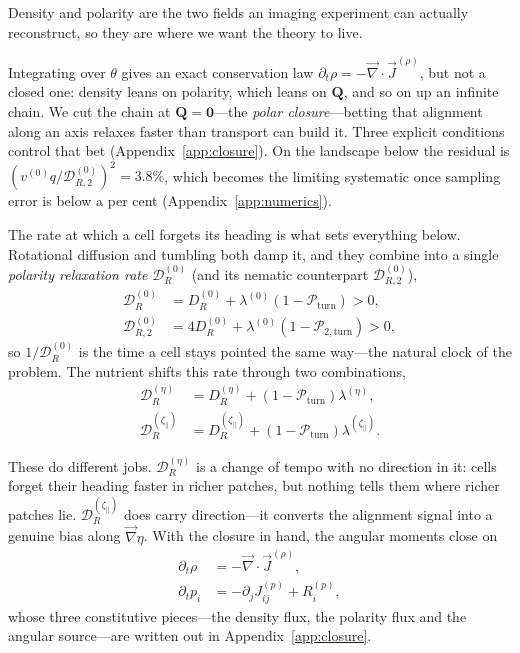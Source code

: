 \documentclass[
  reprint,
  superscriptaddress,
  amsmath,
  amssymb,
  aps,
  pre,
  nofootinbib,
  floatfix
]{revtex4-2}
\newcommand{\Qt}{\mathbf Q}
\newcommand{\grad}{\vec{\nabla}}
\newcommand{\Pturn}{\mathcal P_{\mathrm{turn}}}
\newcommand{\Pturntwo}{\mathcal P_{2,\mathrm{turn}}}
\newcommand{\DR}{\mathcal D_R^{(0)}}
\newcommand{\DRtwo}{\mathcal D_{R,2}^{(0)}}
\newcommand{\zp}{\zeta_\parallel}
\begin{document}
Density and polarity are the two fields an imaging experiment can actually
reconstruct, so they are where we want the theory to live.

Integrating over $\theta$ gives an exact conservation law
$\partial_t\rho=-\grad\cdot\vec J^{(\rho)}$, but not a closed one: density
leans on polarity, which leans on $\Qt$, and so on up an infinite chain.  We
cut the chain at $\Qt=\mathbf0$---the \emph{polar closure}---betting that
alignment along an axis relaxes faster than transport can build it.  Three
explicit conditions control that bet (Appendix~\ref{app:closure}).  On the
landscape below the residual is
$(v^{(0)}q/\DRtwo)^{2}=3.8\%$, which becomes the limiting systematic once
sampling error is below a per cent (Appendix~\ref{app:numerics}).

The rate at which a cell forgets its heading is what sets everything below.
Rotational diffusion and tumbling both damp it, and they combine into a single
\emph{polarity relaxation rate} $\DR$ (and its nematic counterpart
$\DRtwo$),
\begin{align}
 \DR &= D_R^{(0)}+\lambda^{(0)}(1-\Pturn)>0,
 \label{eq:gamma}\\
 \DRtwo &= 4D_R^{(0)}+\lambda^{(0)}(1-\Pturntwo)>0,
 \label{eq:gamma2}
\end{align}
so $1/\DR$ is the time a cell stays pointed the same way---the natural clock
of the problem.  The nutrient shifts this rate through two combinations,
\begin{align}
 \mathcal D_R^{(\eta)} &= D_R^{(\eta)} + (1-\Pturn)\lambda^{(\eta)},
 \nonumber\\
 \mathcal D_R^{(\zp)} &= D_R^{(\zp)} + (1-\Pturn)\lambda^{(\zp)}.
 \label{eq:gamma-response}
\end{align}

These do different jobs.  $\mathcal D_R^{(\eta)}$ is a change of tempo with no
direction in it: cells forget their heading faster in richer patches, but
nothing tells them where richer patches lie.  $\mathcal D_R^{(\zp)}$ does
carry direction---it converts the alignment signal into a genuine bias along
$\grad\eta$.  With the closure in hand, the angular moments close on
\begin{subequations}
\label{eq:polar-closed-system}
\begin{align}
 \partial_t\rho &= -\grad\cdot\vec J^{(\rho)},
 \label{eq:polar-closed-density}\\
 \partial_t p_i &= -\partial_j J_{ij}^{(p)} + R_i^{(p)},
 \label{eq:polar-closed-polarity}
\end{align}
\end{subequations}
whose three constitutive pieces---the density flux, the polarity flux and the
angular source---are written out in Appendix~\ref{app:closure}.
\end{document}
